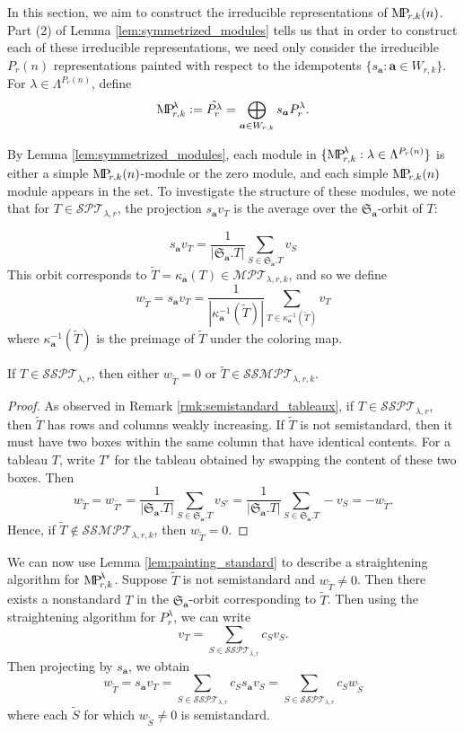 \documentclass[ALCO,Unicode,published]{cedram}
\newcommand{\SG}{\mathfrak{S}}
\newcommand{\bfa}{{\boldsymbol{a}}}
\newcommand{\MP}{{\rm M\!P\!}}
\newcommand{\MPT}{\mathcal{MPT}}
\newcommand{\SPT}{\mathcal{SPT}}
\newcommand{\SSPT}{\mathcal{SSPT}}
\newcommand{\SSMPT}{\mathcal{SSMPT}}
\newcommand{\tS}{{\tilde{S}}}
\newcommand{\tT}{{\tilde{T}}}
\newcommand{\abs}[1]{\left| #1\right |}
\begin{document}
In this section, we aim to construct the irreducible representations of $\MP_{r,k}(n)$. Part (2) of Lemma \ref{lem:symmetrized_modules} tells us that in order to construct each of these irreducible representations, we need only consider the irreducible $P_r(n)$ representations painted with respect to the idempotents $\{s_\bfa:\bfa\in W_{r,k}\}$. For $\lambda\in\Lambda^{P_r(n)}$, define \[\MP_{r,k}^\lambda\vcentcolon= \tilde{P_r^\lambda}= \bigoplus_{\bfa\in W_{r,k}}s_\bfa P_r^\lambda.\]

By Lemma \ref{lem:symmetrized_modules}, each module in $\{\MP_{r,k}^\lambda:\lambda\in\Lambda^{P_r(n)}\}$ is either a simple $\MP_{r,k}(n)$-module or the zero module, and each simple $\MP_{r,k}(n)$ module appears in the set. To investigate the structure of these modules, we note that for $T\in\SPT_{\lambda,r}$, the projection $s_\bfa v_T$ is the average over the $\SG_\bfa$-orbit of $T$:

\[s_\bfa v_T=\frac{1}{\abs{\SG_\bfa.T}}\sum_{S\in\SG_\bfa.T}v_S\] This orbit corresponds to $\tT=\kappa_\bfa(T)\in\MPT_{\lambda,r,k}$, and so we define \[w_\tT=s_\bfa v_T=\frac{1}{\abs{\kappa_\bfa^{-1}(\tT)}}\sum_{T\in\kappa_\bfa^{-1}(\tT)} v_T\] where $\kappa_\bfa^{-1}(\tT)$ is the preimage of $\tT$ under the coloring map.

\begin{lemma}\label{lem:painting_standard} If $T\in\SSPT_{\lambda,r}$, then either $w_\tT=0$ or $\tT\in\SSMPT_{\lambda,r,k}$.
\end{lemma}

\begin{proof}
    As observed in Remark \ref{rmk:semistandard_tableaux}, if $T\in\SSPT_{\lambda,r}$, then $\tT$ has rows and columns weakly increasing. If $\tT$ is not semistandard, then it must have two boxes within the same column that have identical contents. For a tableau $T$, write $T'$ for the tableau obtained by swapping the content of these two boxes. Then \[w_{\tT}=w_{\tilde{T'}}=\frac{1}{\abs{\SG_\bfa.T}}\sum_{S\in\SG_\bfa.T}v_{S'}=\frac{1}{\abs{\SG_\bfa.T}}\sum_{S\in\SG_\bfa.T}-v_{S}=-w_{\tT}.\] Hence, if $\tT\notin\SSMPT_{\lambda,r,k}$, then $w_\tT=0$.
\end{proof}

We can now use Lemma \ref{lem:painting_standard} to describe a straightening algorithm for $\MP_{r,k}^\lambda$. Suppose $\tT$ is not semistandard and $w_\tT\neq0$. Then there exists a nonstandard $T$ in the $\SG_\bfa$-orbit corresponding to $\tT$. Then using the straightening algorithm for $P_r^\lambda$, we can write \[v_T=\sum_{S\in\SSPT_{\lambda,r}}c_Sv_S.\]
Then projecting by $s_\bfa$, we obtain \[w_\tT=s_\bfa v_T=\sum_{S\in\SSPT_{\lambda,r}} c_S s_\bfa v_S=\sum_{S\in\SSPT_{\lambda,r}} c_S w_\tS\] where each $\tS$ for which $w_{\tS}\neq0$ is semistandard.
\end{document}
